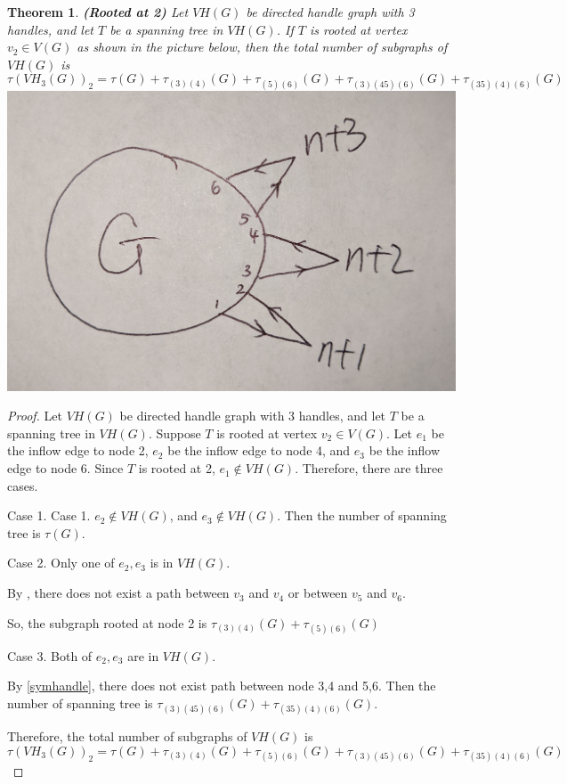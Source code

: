 \documentclass[twoside,11pt]{article}
\newtheorem{theorem}{Theorem}[section]
\numberwithin{equation}{section} \DeclareMathOperator{\Var}{Var}
\newcommand{\bpf}{\begin{proof}}
\newcommand{\epf}{\end{proof}}
\newcommand{\bthm}{\begin{theorem}}
\newcommand{\ethm}{\end{theorem}}
\begin{document}
\bthm
{\bf (Rooted at 2)}
Let $VH(G)$ be directed handle graph with 3 handles, and let $T$ be a spanning tree in $VH(G)$. If $T$ is rooted at vertex $v_2\in V(G)$ as shown in the picture below,
then the total number of subgraphs of $VH(G)$ is  
\[
\tau(VH_3(G))_2 = \tau(G) + \tau_{(3)(4)}(G) + \tau_{(5)(6)}(G) + \tau_{(3)(45)(6)}(G)+ \tau_{(35)(4)(6)}(G)
\]
\includegraphics[scale=0.025]{graph3_1.jpg}
\ethm

\bpf
Let $VH(G)$ be directed handle graph with 3 handles, and let $T$ be a spanning tree in $VH(G)$. Suppose $T$ is rooted at vertex $v_2\in V(G)$. Let $e_1$ be the inflow edge to node 2, $e_2$ be the inflow edge to node 4, and $e_3$ be the inflow edge to node 6. Since $T$ is rooted at 2, $e_1 \notin VH(G)$. Therefore, there are three cases.

Case 1. Case 1. $e_2\notin VH(G)$, and $e_3\notin VH(G)$. Then the number of spanning tree is $\tau(G)$.

Case 2. Only one of $e_2, e_3$ is in $VH(G)$. 

By , there does not exist a path between $v_3$ and $v_4$ or between $v_5$ and $v_6$.

So, the subgraph rooted at node 2 is $\tau_{(3)(4)}(G)+ \tau_{(5)(6)}(G)$

Case 3. Both of $e_2, e_3$ are in $VH(G)$.

By \cref{symhandle}, there does not exist path between node 3,4 and 5,6. Then the number of spanning tree is $\tau_{(3)(45)(6)}(G)+ \tau_{(35)(4)(6)}(G)$.

Therefore, the total number of subgraphs of $VH(G)$ is  \[
\tau(VH_3(G))_2 = \tau(G) + \tau_{(3)(4)}(G) + \tau_{(5)(6)}(G) + \tau_{(3)(45)(6)}(G)+ \tau_{(35)(4)(6)}(G)
\]
\epf
\end{document}
